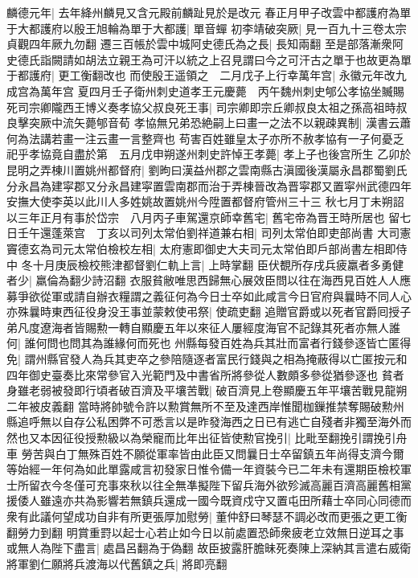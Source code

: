 麟德元年|{
	去年絳州麟見又含元殿前麟趾見於是改元}
春正月甲子改雲中都護府為單于大都護府以殷王旭輪為單于大都護|{
	單音蟬}
初李靖破突厥|{
	見一百九十三卷太宗貞觀四年厥九勿翻}
遷三百帳於雲中城阿史德氏為之長|{
	長知兩翻}
至是部落漸衆阿史德氏詣闕請如胡法立親王為可汗以統之上召見謂曰今之可汗古之單于也故更為單于都護府|{
	更工衡翻改也}
而使殷王遥領之　二月戊子上行幸萬年宫|{
	永徽元年改九成宫為萬年宫}
夏四月壬子衛州刺史道孝王元慶薨　丙午魏州刺史郇公孝協坐贓賜死司宗卿隴西王博义奏孝協父叔良死王事|{
	司宗卿即宗丘卿叔良太祖之孫高祖時叔良擊突厥中流矢薨郇音荀}
孝協無兄弟恐絶嗣上曰畫一之法不以親疎異制|{
	漢書云蕭何為法講若畫一注云畫一言整齊也}
苟害百姓雖皇太子亦所不赦孝協有一子何憂乏祀乎孝協竟自盡於第　五月戊申朔遂州刺史許悼王孝薨|{
	孝上子也後宫所生}
乙卯於昆明之弄棟川置姚州都督府|{
	劉昫曰漢益州郡之雲南縣古滇國後漢屬永昌郡蜀劉氏分永昌為建寜郡又分永昌建寜置雲南郡而治于弄棟晉改為晋寜郡又置寜州武德四年安撫大使李英以此川人多姓姚故置姚州今陞置都督府管州三十三}
秋七月丁未朔詔以三年正月有事於岱宗　八月丙子車駕還京師幸舊宅|{
	舊宅帝為晋王時所居也}
留七日壬午還蓬萊宫　丁亥以司列太常伯劉祥道兼右相|{
	司列太常伯即吏部尚書}
大司憲竇德玄為司元太常伯檢校左相|{
	太府憲即御史大夫司元太常伯即戶部尚書左相即侍中}
冬十月庚辰檢校熊津都督劉仁軌上言|{
	上時掌翻}
臣伏覩所存戌兵疲羸者多勇健者少|{
	羸倫為翻少詩沼翻}
衣服貧敝唯思西歸無心展效臣問以往在海西見百姓人人應募爭欲從軍或請自辦衣糧謂之義征何為今日士卒如此咸言今日官府與曩時不同人心亦殊曩時東西征役身没王事並蒙敕使弔祭|{
	使疏吏翻}
追贈官爵或以死者官爵囘授子弟凡度遼海者皆賜勲一轉自顯慶五年以來征人屢經度海官不記錄其死者亦無人誰何|{
	誰何問也問其為誰緣何而死也}
州縣每發百姓為兵其壯而富者行錢參逐皆亡匿得免|{
	謂州縣官發人為兵其吏卒之參陪隨逐者富民行錢與之相為掩蔽得以亡匿按元和四年御史臺奏比來常參官入光範門及中書省所將參從人數頗多參從猶參逐也}
貧者身雖老弱被發即行頃者破百濟及平壤苦戰|{
	破百濟見上卷顯慶五年平壤苦戰見龍朔二年被皮義翻}
當時將帥號令許以勲賞無所不至及達西岸惟聞枷鏁推禁奪賜破勲州縣追呼無以自存公私困弊不可悉言以是昨發海西之日已有逃亡自殘者非獨至海外而然也又本因征役授勲級以為榮寵而比年出征皆使勲官挽引|{
	比毗至翻挽引謂挽引舟車}
勞苦與白丁無殊百姓不願從軍率皆由此臣又問曩日士卒留鎮五年尚得支濟今爾等始經一年何為如此單露咸言初發家日惟令備一年資裝今已二年未有還期臣檢校軍士所留衣今冬僅可充事來秋以往全無凖擬陛下留兵海外欲殄滅高麗百濟高麗舊相黨援倭人雖遠亦共為影響若無鎮兵還成一國今既資戍守又置屯田所藉士卒同心同德而衆有此議何望成功自非有所更張厚加慰勞|{
	董仲舒曰琴瑟不調必改而更張之更工衡翻勞力到翻}
明賞重罸以起士心若止如今日以前處置恐師衆疲老立效無日逆耳之事或無人為陛下盡言|{
	處昌呂翻為于偽翻}
故臣披露肝膽昧死奏陳上深納其言遣右威衛將軍劉仁願將兵渡海以代舊鎮之兵|{
	將即亮翻}
